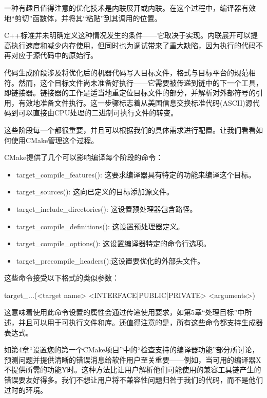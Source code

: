 一种有趣且值得注意的优化技术是内联展开或内联。在这个过程中，编译器有效地“剪切”函数体，并将其“粘贴”到其调用的位置。

C++标准并未明确定义这种情况发生的条件——它取决于实现。内联展开可以提高执行速度和减少内存使用，但同时也为调试带来了重大缺陷，因为执行的代码不再对应于源代码中的原始行。

代码生成阶段涉及将优化后的机器代码写入目标文件，格式与目标平台的规范相符。然而，这个目标文件尚未准备好执行——它需要被传递到链中的下一个工具，即链接器。链接器的工作是适当地重定位目标文件的部分，并解析对外部符号的引用，有效地准备文件执行。这一步骤标志着从美国信息交换标准代码(ASCII)源代码到可以直接由CPU处理的二进制可执行文件的转变。

这些阶段每一个都很重要，并且可以根据我们的具体需求进行配置。让我们看看如何使用CMake管理这个过程。


CMake提供了几个可以影响编译每个阶段的命令：

\begin{itemize}
\item
target\_compile\_features(): 这要求编译器具有特定的功能来编译这个目标。

\item
target\_sources(): 这向已定义的目标添加源文件。

\item
target\_include\_directories(): 这设置预处理器包含路径。

\item
target\_compile\_definitions(): 这设置预处理器定义。

\item
target\_compile\_options(): 这设置编译器特定的命令行选项。

\item
target\_precompile\_headers():这设置要优化的外部头文件。
\end{itemize}

这些命令接受以下格式的类似参数：

\begin{shell}
target_...(<target name> <INTERFACE|PUBLIC|PRIVATE> <arguments>)
\end{shell}

这意味着使用此命令设置的属性会通过传递使用要求，如第5章“处理目标”中所述，并且可以用于可执行文件和库。还值得注意的是，所有这些命令都支持生成器表达式。


如第4章“设置您的第一个CMake项目”中的“检查支持的编译器功能”部分所讨论，预测问题并提供清晰的错误消息给软件用户至关重要——例如，当可用的编译器X不提供所需的功能Y时。这种方法比让用户解析他们可能使用的兼容工具链产生的错误要友好得多。我们不想让用户将不兼容性问题归咎于我们的代码，而不是他们过时的环境。

